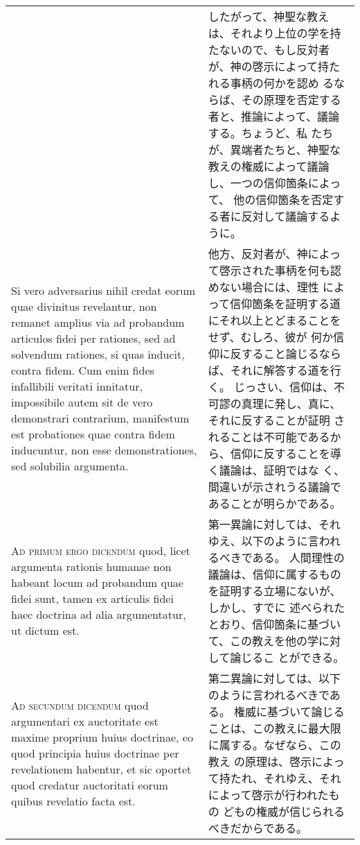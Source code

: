 \documentclass[10pt]{jsarticle} %
\begin{document}
\begin{longtable}{p{21em}p{21em}}
&

したがって、神聖な教えは、それより上位の学を持たないので、もし反対者が、神の啓示によって持たれる事柄の何かを認め
 るならば、その原理を否定する者と、推論によって、議論する。ちょうど、私
 たちが、異端者たちと、神聖な教えの権威によって議論し、一つの信仰箇条によって、
 他の信仰箇条を否定する者に反対して議論するように。


\\


Si vero adversarius nihil credat eorum
quae divinitus revelantur, non remanet amplius via ad probandum
articulos fidei per rationes, sed ad solvendum rationes, si quas
inducit, contra fidem. Cum enim fides infallibili veritati innitatur,
impossibile autem sit de vero demonstrari contrarium, manifestum est
probationes quae contra fidem inducuntur, non esse demonstrationes, sed
solubilia argumenta.


&

他方、反対者が、神によって啓示された事柄を何も認めない場合には、理性
 によって信仰箇条を証明する道にそれ以上とどまることをせず、むしろ、彼が
 何か信仰に反すること論じるならば、それに解答する道を行く。
じっさい、信仰は、不可謬の真理に発し、真に、それに反することが証明
 されることは不可能であるから、信仰に反することを導く議論は、証明ではな
 く、間違いが示されうる議論であることが明らかである。


\\


{\scshape Ad primum ergo dicendum} quod, licet argumenta
rationis humanae non habeant locum ad probandum quae fidei sunt, tamen
ex articulis fidei haec doctrina ad alia argumentatur, ut dictum est.


&

第一異論に対しては、それゆえ、以下のように言われるべきである。
人間理性の議論は、信仰に属するものを証明する立場にないが、しかし、すでに
 述べられたとおり、信仰箇条に基づいて、この教えを他の学に対して論じるこ
 とができる。




\\


{\scshape Ad secundum dicendum} quod argumentari ex
auctoritate est maxime proprium huius doctrinae, eo quod principia huius
doctrinae per revelationem habentur, et sic oportet quod credatur
auctoritati eorum quibus revelatio facta est. 

&

第二異論に対しては、以下のように言われるべきである。
権威に基づいて論じることは、この教えに最大限に属する。なぜなら、この教え
 の原理は、啓示によって持たれ、それゆえ、それによって啓示が行われたもの
 どもの権威が信じられるべきだからである。


\end{longtable}
\end{document}
